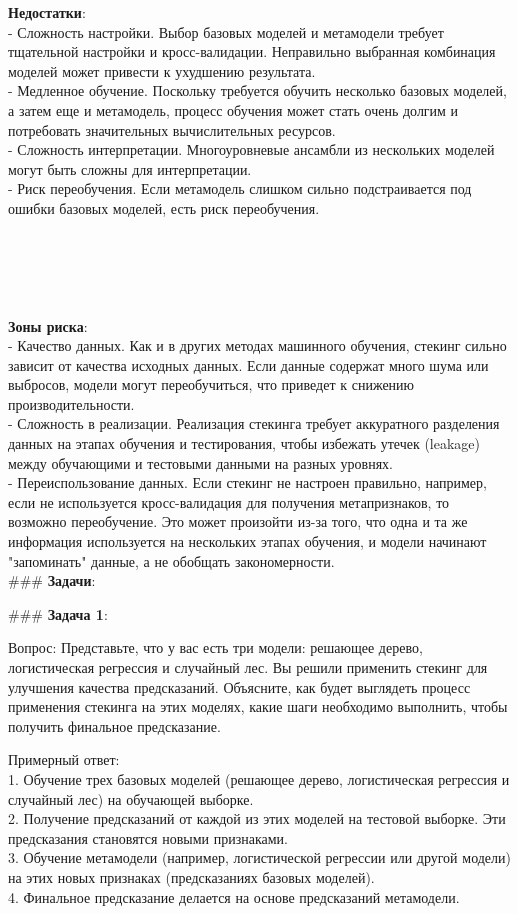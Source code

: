 \textbf{Недостатки}:\\
- Сложность настройки. Выбор базовых моделей и метамодели требует тщательной настройки и кросс-валидации. Неправильно выбранная комбинация моделей может привести к ухудшению результата.\\
- Медленное обучение. Поскольку требуется обучить несколько базовых моделей, а затем еще и метамодель, процесс обучения может стать очень долгим и потребовать значительных вычислительных ресурсов.\\
- Сложность интерпретации. Многоуровневые ансамбли из нескольких моделей могут быть сложны для интерпретации.\\
- Риск переобучения. Если метамодель слишком сильно подстраивается под ошибки базовых моделей, есть риск переобучения.\\
\\
\\
\\
\\
\\
\textbf{Зоны риска}:\\
- Качество данных. Как и в других методах машинного обучения, стекинг сильно зависит от качества исходных данных. Если данные содержат много шума или выбросов, модели могут переобучиться, что приведет к снижению производительности.\\
- Сложность в реализации. Реализация стекинга требует аккуратного разделения данных на этапах обучения и тестирования, чтобы избежать утечек (leakage) между обучающими и тестовыми данными на разных уровнях. \\
- Переиспользование данных. Если стекинг не настроен правильно, например, если не используется кросс-валидация для получения метапризнаков, то возможно переобучение. Это может произойти из-за того, что одна и та же информация используется на нескольких этапах обучения, и модели начинают "запоминать" данные, а не обобщать закономерности.\\

### \textbf{Задачи}:

### \textbf{Задача 1}:

Вопрос: Представьте, что у вас есть три модели: решающее дерево, логистическая регрессия и случайный лес. Вы решили применить стекинг для улучшения качества предсказаний. Объясните, как будет выглядеть процесс применения стекинга на этих моделях, какие шаги необходимо выполнить, чтобы получить финальное предсказание.

Примерный ответ: \\
1. Обучение трех базовых моделей (решающее дерево, логистическая регрессия и случайный лес) на обучающей выборке.\\
2. Получение предсказаний от каждой из этих моделей на тестовой выборке. Эти предсказания становятся новыми признаками.\\
3. Обучение метамодели (например, логистической регрессии или другой модели) на этих новых признаках (предсказаниях базовых моделей).\\
4. Финальное предсказание делается на основе предсказаний метамодели.


